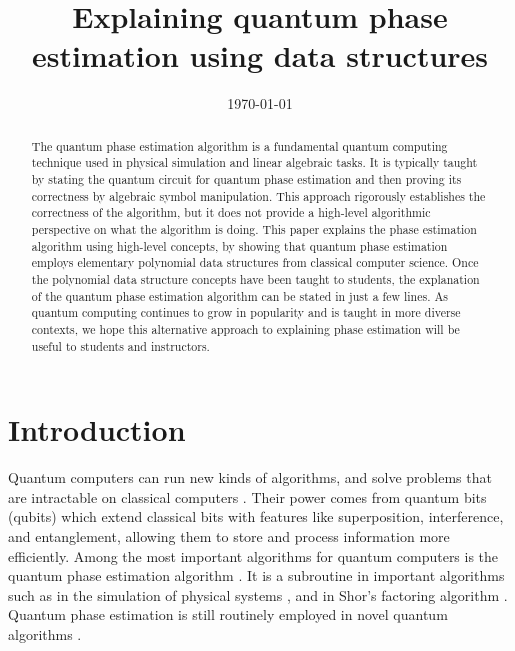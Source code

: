 \documentclass[prb,preprint]{revtex4}
\begin{document}
	

\title{Explaining quantum phase estimation using data structures}
\date{\today}
\begin{abstract}
	The quantum phase estimation algorithm is a fundamental quantum computing technique used in physical simulation and linear algebraic tasks. 
	It is typically taught by stating the quantum circuit for quantum phase estimation and then proving its correctness by algebraic symbol manipulation. This approach rigorously establishes the correctness of the algorithm, but it does not provide a high-level algorithmic perspective on what the algorithm is doing.
	This paper explains the phase estimation algorithm using high-level concepts, by showing that quantum phase estimation employs elementary polynomial data structures from classical computer science. 
	Once the polynomial data structure concepts have been taught to students, the explanation of the quantum phase estimation algorithm can be stated in just a few lines.
	As quantum computing continues to grow in popularity and is taught in more diverse contexts, we hope this alternative approach to explaining phase estimation will be useful to students and instructors.
\end{abstract}
\maketitle



\section{Introduction}
	
Quantum computers can run new kinds of algorithms, and solve problems that are intractable on classical computers \cite{nielsen2010quantum}. Their power comes from quantum bits (qubits) which extend classical bits with features like superposition, interference, and entanglement, allowing them to store and process information more efficiently. Among the most important algorithms for quantum computers is the quantum phase estimation algorithm \cite{kitaev1995quantum}. It is a subroutine in important algorithms such as in the simulation of physical systems \cite{abrams1999quantum}, and in Shor’s factoring algorithm \cite{shor1994algorithms}. Quantum phase estimation is still routinely employed in novel quantum algorithms \cite{schmidhuber2025quartic, berry2024analyzing}.
\end{document}
